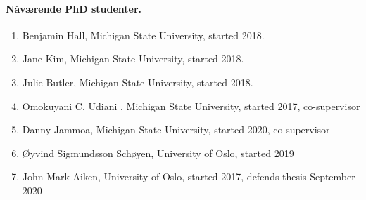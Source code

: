 \documentclass[aps,floatfix,preprint]{revtex4-1}
\begin{document}
\paragraph*{Nåværende PhD studenter.}
\begin{enumerate}
\item Benjamin Hall, Michigan State University, started 2018.

\item Jane Kim, Michigan State University, started 2018.

\item Julie Butler, Michigan State University, started 2018.

\item Omokuyani C. Udiani , Michigan State University, started 2017, co-supervisor

\item Danny Jammoa, Michigan State University, started 2020, co-supervisor

\item Øyvind Sigmundsson Schøyen, University of Oslo, started 2019

\item John Mark Aiken, University of Oslo, started 2017, defends thesis September 2020
\end{enumerate}

\noindent
\end{document}
